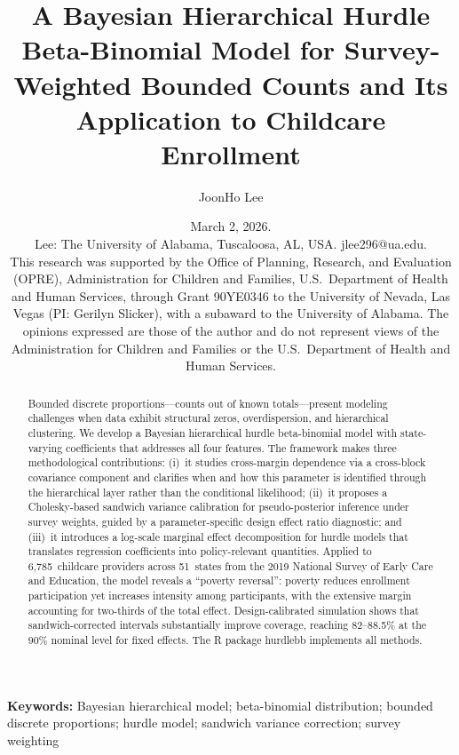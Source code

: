 \documentclass[12pt, reqno]{amsart}  %
\title{\Large A Bayesian Hierarchical Hurdle Beta-Binomial Model for Survey-Weighted Bounded Counts and Its Application to Childcare Enrollment}
\author{JoonHo Lee}
\date{\footnotesize March 2, 2026. \\[0.5em]
Lee: The University of Alabama, Tuscaloosa, AL, USA. jlee296@ua.edu.
\\[0.5em]
This research was supported by the Office of Planning, Research, and Evaluation (OPRE), Administration for Children and Families, U.S.\ Department of Health and Human Services, through Grant 90YE0346 to the University of Nevada, Las Vegas (PI: Gerilyn Slicker), with a subaward to the University of Alabama. The opinions expressed are those of the author and do not represent views of the Administration for Children and Families or the U.S.\ Department of Health and Human Services.
}
\numberwithin{equation}{section}  %
\begin{document}

\begin{abstract}
Bounded discrete proportions---counts out of known totals---present
modeling challenges when data exhibit structural zeros, overdispersion,
and hierarchical clustering.  We develop a Bayesian hierarchical hurdle
beta-binomial model with state-varying coefficients that addresses
all four features.  The framework makes three methodological contributions:
(i)~it studies cross-margin dependence via a cross-block covariance
component and clarifies when and how this parameter is identified
through the hierarchical layer rather than the conditional likelihood;
(ii)~it proposes a Cholesky-based sandwich variance calibration for
pseudo-posterior inference under survey weights, guided by a
parameter-specific design effect ratio diagnostic; and
(iii)~it introduces a log-scale marginal effect decomposition
for hurdle models that translates regression coefficients
into policy-relevant quantities.  Applied to
6,785~childcare providers across 51~states from the 2019 National Survey
of Early Care and Education, the model reveals a ``poverty reversal'':
poverty reduces enrollment participation yet increases intensity among
participants, with the extensive margin accounting for two-thirds of the
total effect.  Design-calibrated simulation shows that sandwich-corrected
intervals substantially improve coverage, reaching 82--88.5\% at
the 90\% nominal level for fixed effects.  The R package \textsf{hurdlebb} implements
all methods.
\end{abstract}

\maketitle  %

\noindent\textbf{Keywords:} Bayesian hierarchical model; beta-binomial distribution; bounded discrete proportions; hurdle model; sandwich variance correction; survey weighting

\pagestyle{plain}  %
\newpage
\end{document}
